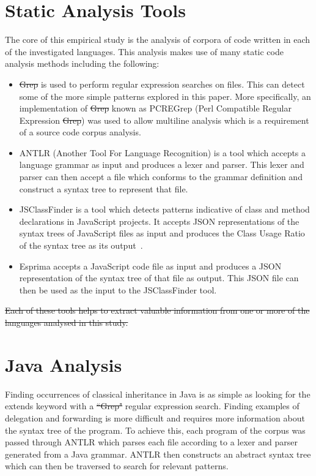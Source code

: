 \documentclass[11pt
              , a4paper
              , twoside
              , openright
              ]{report}
\providecommand{\DIFadd}[1]{{\protect\color{blue}\uwave{#1}}} %
\providecommand{\DIFdel}[1]{{\protect\color{red}\sout{#1}}}                      %
\providecommand{\DIFaddbegin}{} %
\providecommand{\DIFaddend}{} %
\providecommand{\DIFdelbegin}{} %
\providecommand{\DIFdelend}{} %
\begin{document}
\section{Static Analysis Tools}
The core of this empirical study is the analysis of corpora of code written in each of the investigated languages. This analysis makes use of many static code analysis methods including the following:
\begin{itemize}
	\item \DIFdelbegin \DIFdel{Grep }\DIFdelend \DIFaddbegin \texttt{\DIFadd{grep}} \DIFaddend is used to perform regular expression searches on files. This can detect some of the more simple patterns explored in this paper. More specifically, an implementation of \DIFdelbegin \DIFdel{Grep }\DIFdelend \DIFaddbegin \texttt{\DIFadd{grep}} \DIFaddend known as PCREGrep (Perl Compatible Regular Expression \DIFdelbegin \DIFdel{Grep}\DIFdelend \DIFaddbegin \texttt{\DIFadd{grep}}\DIFaddend ) was used to allow multiline analysis which is a requirement of a source code corpus analysis.
	\item ANTLR (Another Tool For Language Recognition) is a tool which accepts a language grammar as input and produces a lexer and parser. This lexer and parser can then accept a file which conforms to the grammar definition and construct a syntax tree to represent that file.
	\item JSClassFinder is a tool which detects patterns indicative of class and method declarations in JavaScript projects. It accepts JSON representations of the syntax trees of JavaScript files as input and produces the Class Usage Ratio of the syntax tree as its output~\cite{JSClassFinder}.
	\item Esprima accepts a JavaScript code file as input and produces a JSON representation of the syntax tree of that file as output. This JSON file can then be used as the input to the JSClassFinder tool.
\end{itemize}
\DIFdelbegin \DIFdel{Each of these tools helps to extract valuable information from one or more of the languages analysed in this study.
}\DIFdelend 

\section{Java Analysis}
Finding occurrences of classical inheritance in Java is as simple as looking for the extends keyword with a \DIFdelbegin \DIFdel{``Grep" }\DIFdelend \DIFaddbegin \texttt{\DIFadd{grep}} \DIFaddend regular expression search. Finding examples of delegation and forwarding is more difficult and requires more information about the syntax tree of the program. To achieve this, each program of the corpus was passed through ANTLR which parses each file according to a lexer and parser generated from a Java grammar. ANTLR then constructs an abstract syntax tree which can then be traversed to search for relevant patterns.
\newline
\end{document}

